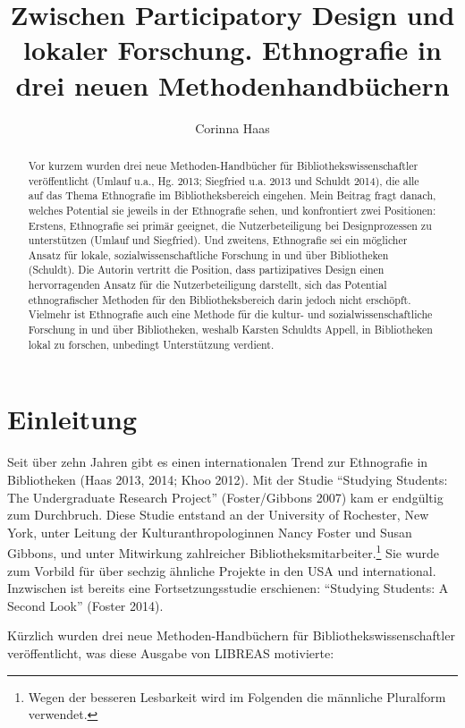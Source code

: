 \documentclass[a4paper,
fontsize=11pt,
oneside,
numbers=noperiodatend,
parskip=half-,
bibliography=totoc,
final
]{scrartcl}
\title{\LARGE{Zwischen Participatory Design und lokaler Forschung. Ethnografie in drei neuen Methodenhandbüchern}} %
\author{Corinna Haas} %
\date{}
\begin{document}
\maketitle
\thispagestyle{fancyplain} 

\begin{abstract}
Vor kurzem wurden drei neue Methoden-Handbücher für
Bibliothekswissenschaftler veröffentlicht (Umlauf u.a., Hg. 2013;
Siegfried u.a. 2013 und Schuldt 2014), die alle auf das Thema
Ethnografie im Bibliotheksbereich eingehen. Mein Beitrag fragt danach,
welches Potential sie jeweils in der Ethnografie sehen, und konfrontiert
zwei Positionen: Erstens, Ethnografie sei primär geeignet, die
Nutzerbeteiligung bei Designprozessen zu unterstützen (Umlauf und
Siegfried). Und zweitens, Ethnografie sei ein möglicher Ansatz für
lokale, sozialwissenschaftliche Forschung in und über Bibliotheken
(Schuldt). Die Autorin vertritt die Position, dass partizipatives Design
einen hervorragenden Ansatz für die Nutzerbeteiligung darstellt, sich
das Potential ethnografischer Methoden für den Bibliotheksbereich darin
jedoch nicht erschöpft. Vielmehr ist Ethnografie auch eine Methode für
die kultur- und sozialwissenschaftliche Forschung in und über
Bibliotheken, weshalb Karsten Schuldts Appell, in Bibliotheken lokal zu
forschen, unbedingt Unterstützung verdient.
\end{abstract}

\section*{Einleitung}\label{einleitung}

Seit über zehn Jahren gibt es einen internationalen Trend zur
Ethnografie in Bibliotheken (Haas 2013, 2014; Khoo 2012). Mit der Studie
\enquote{Studying Students: The Undergraduate Research Project}
(Foster/Gibbons 2007) kam er endgültig zum Durchbruch. Diese Studie
entstand an der University of Rochester, New York, unter Leitung der
Kulturanthropologinnen Nancy Foster und Susan Gibbons, und unter
Mitwirkung zahlreicher Bibliotheksmitarbeiter.\footnote{Wegen der
  besseren Lesbarkeit wird im Folgenden die männliche Pluralform
  verwendet.} Sie wurde zum Vorbild für über sechzig ähnliche Projekte
in den USA und international. Inzwischen ist bereits eine
Fortsetzungsstudie erschienen: \enquote{Studying Students: A Second
Look} (Foster 2014).

Kürzlich wurden drei neue Methoden-Handbüchern für
Bibliothekswissenschaftler veröffentlicht, was diese Ausgabe von LIBREAS
motivierte:
\end{document}
